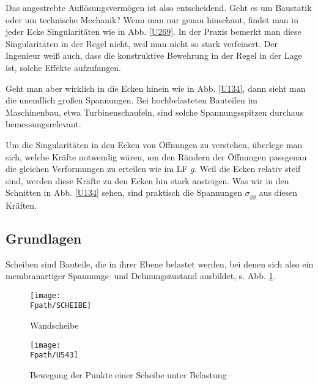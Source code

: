 {Das angestrebte Aufl\"{o}sungsverm\"{o}gen ist also entscheidend. Geht es um Baustatik oder um technische Mechanik? Wenn man nur genau hinschaut, findet man in jeder Ecke Singularit\"{a}ten wie in Abb. \ref{U269}. In der Praxis bemerkt man diese Singularit\"{a}ten in der Regel nicht, weil man nicht so stark verfeinert. Der Ingenieur wei{\ss} auch, dass die konstruktive Bewehrung in der Regel in der Lage ist, solche Effekte aufzufangen.

Geht man aber wirklich in die Ecken hinein wie in Abb. \ref{U134}, dann sieht man die unendlich gro{\ss}en Spannungen. Bei hochbelasteten Bauteilen im Maschinenbau, etwa Turbinenschaufeln, sind solche Spannungsspitzen durchaus bemessungsrelevant.

Um die Singularit\"{a}ten in den Ecken von \"{O}ffnungen zu verstehen, \"{u}berlege man sich, welche Kr\"{a}fte notwendig w\"{a}ren, um den R\"{a}ndern der \"{O}ffnungen passgenau die gleichen Verformungen zu erteilen wie im LF $g$. Weil die Ecken relativ steif sind, werden diese Kr\"{a}fte zu den Ecken hin stark ansteigen. Was wir in den Schnitten in Abb. \ref{U134} sehen, sind praktisch die Spannungen $\sigma_{yy}$ aus diesen Kr\"{a}ften.
 

{\textcolor{sectionTitleBlue}{\section{Grundlagen}}}\label{Grundlagen}
Scheiben sind Bauteile, die in ihrer Ebene belastet werden,  bei denen sich also ein membranartiger Spannungs- und Dehnungszustand ausbildet, s. Abb. \ref{Scheibe41}.


\begin{figure}[tbp] \centering
\if {} \sidecaption \fi
\texttt{[image: \\Fpath/SCHEIBE]}
\caption{Wandscheibe} \label{Scheibe41}
\end{figure}%

\begin{figure}[tbp] \centering
\if {} \sidecaption \fi
\texttt{[image: \\Fpath/U543]}%
\caption{Bewegung der Punkte einer Scheibe unter Belastung} \label{U543}
\end{figure}%




}
